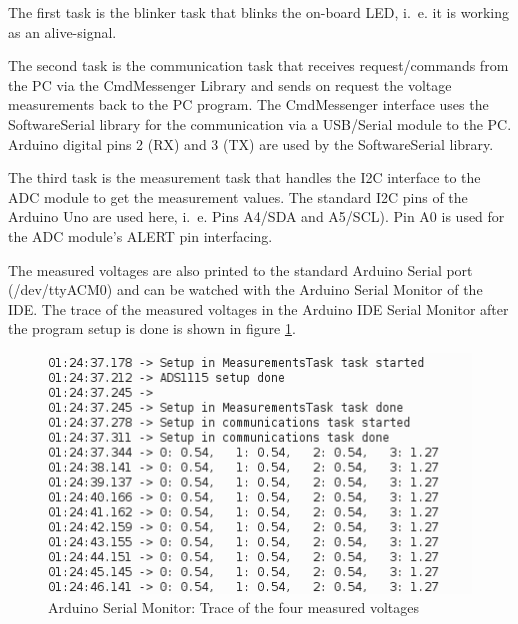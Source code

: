 \documentclass[11pt, oneside]{scrartcl}   	%
\begin{document}
The first task is the blinker task that blinks the on-board LED, i.~e. it is working as an alive-signal.

The second task is the communication task that receives request/commands from the PC via the CmdMessenger Library and sends on request the voltage measurements
back to the PC program. The CmdMessenger interface uses the SoftwareSerial library for the communication via a USB/Serial module to the PC. 
Arduino digital pins 2 (RX) and 3 (TX) are used by the SoftwareSerial library.

The third task is the measurement task that handles the I2C interface to the ADC module to get the measurement values. The standard I2C pins of the Arduino Uno are used here, i.~e. Pins A4/SDA and A5/SCL). Pin A0 is used for the ADC module's ALERT pin interfacing.

The measured voltages are also printed to the standard Arduino Serial port (/dev/ttyACM0) and can be watched with the Arduino Serial Monitor of the IDE.
The trace of the measured voltages in the Arduino IDE Serial Monitor after the program setup is done is shown in figure \ref{fig:ArduinoSerialMonitorTrace}.
\begin{figure}[htbp]
	\centering
	\includegraphics[width=0.9\linewidth]{Figures/ArduinoSerialMonitorTrace.png}
	\caption[Arduino Serial Monitor: Trace of four measured voltages]{Arduino Serial Monitor: Trace of the four measured voltages}
	\label{fig:ArduinoSerialMonitorTrace}
\end{figure}
\end{document}
